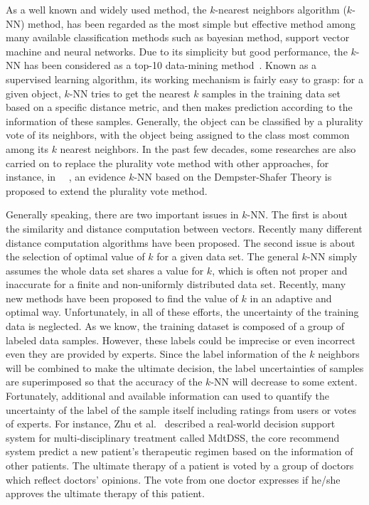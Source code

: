 \documentclass[runningheads]{llncs}
\begin{document}
As a well known and widely used method, the $k$-nearest neighbors algorithm ($k$-NN) method, has been regarded as the most simple but effective method among many available classification methods such as bayesian method, support vector machine and neural networks. Due to its simplicity but good performance, the $k$-NN has been considered as a top-10 data-mining method~\cite{ref_article2}. Known as a supervised learning algorithm, its working mechanism is fairly easy to grasp: for a given object, $k$-NN tries to get the nearest $k$ samples in the training data set based on a specific distance metric, and then makes prediction according to the information of these samples.  Generally, the object can be classified by a plurality vote of its neighbors, with the object being assigned to the class most common among its $k$ nearest neighbors. In the past few decades, some researches are also carried on to replace the plurality vote method with other approaches, for instance, in ~\cite{ref_article3}~\cite{ref_article4}, an evidence $k$-NN based on the Dempster-Shafer Theory is proposed to extend the plurality vote method.

Generally speaking, there are two important issues in $k$-NN. The first is about the similarity and distance computation between vectors. Recently many different distance computation algorithms have been proposed. The second issue is about the selection of optimal value of $k$ for a given data set. The general $k$-NN simply assumes the whole data set shares a value for $k$, which is often not proper and inaccurate for a finite and non-uniformly distributed data set. Recently, many new methods have been proposed to find the value of $k$ in an adaptive and optimal way. Unfortunately, in all of these efforts, the uncertainty of the training data is neglected. As we know, the training dataset is composed of a group of labeled data samples. However, these labels could be imprecise or even incorrect even they are provided by experts. Since the label information of the $k$ neighbors will be combined to make the ultimate decision, the label uncertainties of samples are superimposed so that the accuracy of the $k$-NN will decrease to some extent. Fortunately, additional and available information can used to quantify the uncertainty of the label of the sample itself including ratings from users or votes of experts. For instance, Zhu et al.~\cite{ref_article9} described a real-world decision support system for multi-disciplinary treatment called MdtDSS, the core recommend system predict a new patient's therapeutic regimen based on the information of other patients. The ultimate therapy of a patient is voted by a group of doctors which reflect doctors' opinions. The vote from one doctor expresses if he/she approves the ultimate therapy of this patient. 
\end{document}

